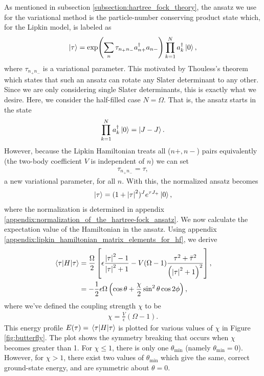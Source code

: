\documentclass[Dual]{msu-thesis}
\begin{document}
As mentioned in subsection \ref{subsection:hartree_fock_theory}, the ansatz we use for the variational method is the particle-number conserving product state which, for the Lipkin model, is labeled as
\begin{align}
\ket{\tau}=\exp(\sum_{n}\tau_{n_+n_-}a^\dagger_{n+}a_{n-})\prod_{k=1}^Na^\dagger_k\ket{0},
\end{align}
where $\tau_{n_+n_-}$ is a variational parameter. This motivated by Thouless's theorem which states that such an ansatz can rotate any Slater determinant to any other. Since we are only considering single Slater determinants, this is exactly what we desire. Here, we consider the half-filled case $N=\Omega$. That is, the ansatz starts in the state
\begin{align}
\prod_{k=1}^Na^\dagger_k\ket{0}=\ket{J-J}
.\end{align}
However, because the Lipkin Hamiltonian treats all ($n+,n-$) pairs equivalently (the two-body coefficient $V$ is independent of $n$) we can set 
\begin{align}
\tau_{n_+n_-}=\tau,
\end{align}
a new variational parameter, for all $n$. With this, the normalized ansatz becomes
\begin{align}
\label{su2coh}
\ket{\tau}=(1+\abs{\tau}^2)^Je^{\tau J_+}\ket{0}
,\end{align}
where the normalization is determined in appendix \ref{appendix:normalization_of_the_hartree-fock_ansatz}. We now calculate the expectation value of the Hamiltonian in the ansatz. Using appendix \ref{appendix:lipkin_hamiltonian_matrix_elements_for_hf}, we derive
\begin{align}
\label{te}
\mel{\tau}{H}{\tau}
&=
\frac{\Omega}{2}\left[\epsilon\frac{\abs{\tau}^2-1}{\abs{\tau}^2+1}-V(\Omega-1)\frac{\tau^2+\bar{\tau}^2}{\left(\abs{\tau}^2+1\right)^2}\right],
\nonumber
\\
&=
-\frac{1}{2}\epsilon\Omega\left(\cos\theta+\frac{\chi}{2}\sin^2\theta\cos2\phi\right),
\end{align}
where we've defined the coupling strength $\chi$ to be
\begin{align}
\chi
=
\frac{V}{\epsilon}(\Omega-1).
\end{align}
This energy profile $E(\tau)=\mel{\tau}{H}{\tau}$ is plotted for various values of $\chi$ in Figure \ref{fig:butterfly}. The plot shows the symmetry breaking that occurs when $\chi$ becomes greater than 1. For $\chi\leq1$, there is only one $\theta_{\text{min}}$ (namely $\theta_{\text{min}}=0$). However, for $\chi>1$, there exist two values of $\theta_{\text{min}}$ which give the same, correct ground-state energy, and are symmetric about $\theta=0$.
\end{document}
